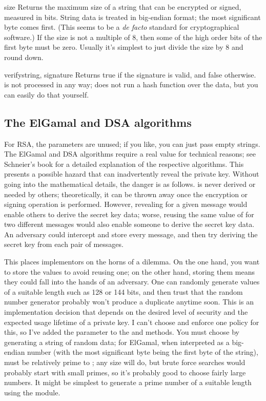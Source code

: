 \documentclass{howto}
\begin{document}
\begin{methoddesc}{size}{}
Returns the maximum size of a string that can be encrypted or signed,
measured in bits.  String data is treated in big-endian format; the most
significant byte comes first.  (This seems to be a \emph{de facto} standard
for cryptographical software.)  If the size is not a multiple of 8, then
some of the high order bits of the first byte must be zero.  Usually
it's simplest to just divide the size by 8 and round down.
\end{methoddesc}

\begin{methoddesc}{verify}{string, signature}
Returns true if the signature is valid, and false otherwise.
 is not processed in any way;  does
not run a hash function over the data, but you can easily do that yourself.
\end{methoddesc}

\subsection{The ElGamal and DSA algorithms}
For RSA, the  parameters are unused; if you like, you can just
pass empty strings.  The ElGamal and DSA algorithms require a real
 value for technical reasons; see Schneier's book for a detailed
explanation of the respective algorithms.  This presents a possible
hazard that can  
inadvertently reveal the private key.  Without going into the
mathematical details, the danger is as follows.  is never derived
or needed by others; theoretically, it can be thrown away once the
encryption or signing operation is performed.  However, revealing
 for a given message would enable others to derive the secret key
data; worse, reusing the same value of  for two different
messages would also enable someone to derive the secret key data.  An
adversary could intercept and store every message, and then try deriving
the secret key from each pair of messages.

This places implementors on the horns of a dilemma.  On the one hand,
you want to store the  values to avoid reusing one; on the other
hand, storing them means they could fall into the hands of an adversary.
One can randomly generate  values of a suitable length such as
128 or 144 bits, and then trust that the random number generator
probably won't produce a duplicate anytime soon.  This is an
implementation decision that depends on the desired level of security
and the expected usage lifetime of a private key.  I can't choose and
enforce one policy for this, so I've added the  parameter to the
 and  methods.  You must choose  by
generating a string of random data; for ElGamal, when interpreted as a
big-endian number (with the most significant byte being the first byte
of the string),  must be relatively prime to ; any
size will do, but brute force searches would probably start with small
primes, so it's probably good to choose fairly large numbers.  It might be
simplest to generate a prime number of a suitable length using the
 module.
\end{document}
